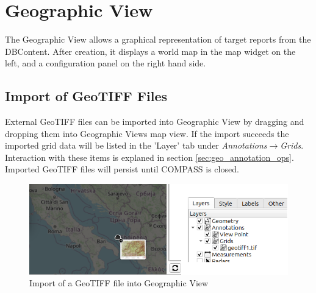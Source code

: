 \chapter{Geographic View}
\label{sec:geo_view}

The Geographic View allows a graphical representation of target reports from the DBContent. After creation, it displays a world map in the map widget on the left, and a configuration panel on the right hand side.









\section{Import of GeoTIFF Files}

External GeoTIFF files can be imported into Geographic View by dragging and dropping them into Geographic Views map view.
If the import succeeds the imported grid data will be listed in the 'Layer' tab under \textit{Annotations}$\rightarrow$\textit{Grids}. 
Interaction with these items is explaned in section \ref{sec:geo_annotation_ops}. \\

Imported GeoTIFF files will persist until COMPASS is closed. \\

\begin{figure}[H]
  \center
    \includegraphics[width=12cm]{figures/geoview_import_geotiff.png}
  \caption{Import of a GeoTIFF file into Geographic View}
\end{figure}
